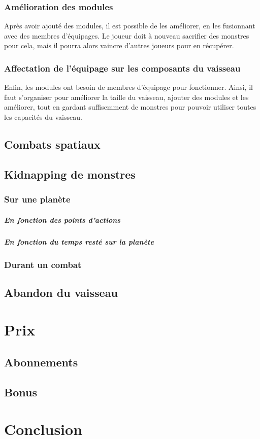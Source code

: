 \documentclass[a4paper,11pt]{report}
\begin{document}
    \subsection{Amélioration des modules}
      Après avoir ajouté des modules, il est possible de les améliorer, en les fusionnant avec des membres d'équipages. 
      Le joueur doit à nouveau sacrifier des monstres pour cela, mais il pourra alors vaincre d'autres joueurs pour en récupérer.
      
    \subsection{Affectation de l'équipage sur les composants du vaisseau}
      Enfin, les modules ont besoin de membres d'équipage pour fonctionner. 
      Ainsi, il faut s'organiser pour améliorer la taille du vaisseau, ajouter des modules et les améliorer, tout en gardant suffisemment de monstres pour pouvoir utiliser toutes les capacités du vaisseau.
          
  \section{Combats spatiaux}
  \section{Kidnapping de monstres}
    \subsection{Sur une planète}
      \paragraph{En fonction des points d'actions}
      \paragraph{En fonction du temps resté sur la planète}
    \subsection{Durant un combat}
  \section{Abandon du vaisseau}
\chapter{Prix}
  \section{Abonnements}
  \section{Bonus}
\chapter{Conclusion}
\end{document}
